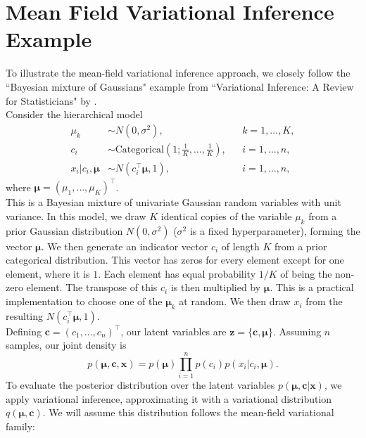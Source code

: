 \documentclass[honours,12pt]{unswthesis}
\numberwithin{equation}{section}
\theoremstyle{definition}
\begin{document}
\chapter{Mean Field Variational Inference Example}\label{app:C}
To illustrate the mean-field variational inference approach, we closely follow the ``Bayesian mixture of Gaussians" example from ``Variational Inference: A Review for Statisticians" by \citet{blei}.\\
Consider the hierarchical model
\begin{align*}
\mu_k&\sim N(0,\sigma^2), &&k=1,\dots,K,\\
c_i&\sim \text{Categorical}\left(1;\frac{1}{K},\dots,\frac{1}{K}\right), &&i=1,\dots,n,\\
x_i|c_i,\bm{\mu}&\sim N(c^\top_i\bm{\mu},1), &&i=1,\dots,n,
\end{align*}
where $\bm{\mu}=(\mu_1,\dots,\mu_K)^\top$.\\
This is a Bayesian mixture of univariate Gaussian random variables with unit variance. In this model, we draw $K$ identical copies of the variable $\mu_k$ from a prior Gaussian distribution $N(0,\sigma^2)$ ($\sigma^2$ is a fixed hyperparameter), forming the vector $\bm{\mu}$. We then generate an indicator vector $c_i$ of length $K$ from a prior categorical distribution. This vector has zeros for every element except for one element, where it is $1$. Each element has equal probability $1/K$ of being the non-zero element. The transpose of this $c_i$ is then multiplied by $\bm{\mu}$. This is a practical implementation to choose one of the $\bm{\mu}_k$ at random. We then draw $x_i$ from the resulting $N(c^\top_i\bm{\mu},1)$.\\
Defining $\bm{c}=(c_1,\dots,c_n)^\top$, our latent variables are $\bm{z}=\{\bm{c},\bm{\mu}\}$. Assuming $n$ samples, our joint density is
\begin{equation}
p(\bm{\mu},\bm{c},\bm{x})=p(\bm{\mu})\prod^n_{i=1}p(c_i)p(x_i|c_i, \bm{\mu}).\end{equation}
To evaluate the posterior distribution over the latent variables $p(\bm{\mu},\bm{c}|\bm{x})$, we apply variational inference, approximating it with a variational distribution $q(\bm{\mu},\bm{c})$. We will assume this distribution follows the mean-field variational family:
\end{document}

